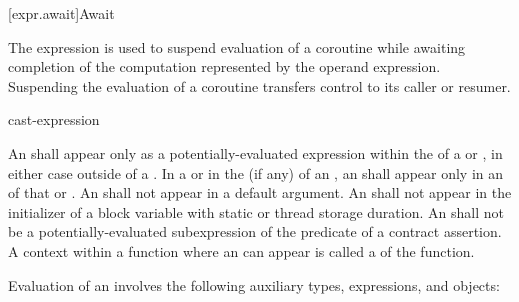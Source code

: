 [expr.await]{Await}
%
%

\pnum
The  expression is used to suspend evaluation of a
coroutine while awaiting completion of
the computation represented by the operand expression.
Suspending the evaluation of a coroutine
transfers control to its caller or resumer.

\begin{bnf}
\br
     cast-expression
\end{bnf}

\pnum
An  shall appear only as a potentially-evaluated
expression within the  of a
 or ,
in either case
outside of a .
In a  or in the
 (if any)
of an , an 
shall appear only in an  of that
 or .
An  shall not appear in a
default argument.
An  shall not appear in the initializer of
a block variable with static or thread storage duration.
An  shall not be
a potentially-evaluated subexpression
of the predicate of a contract assertion.
A context within a function where an  can appear
is called a  of the function.

\pnum
Evaluation of an  involves the following
auxiliary types, expressions, and objects:

